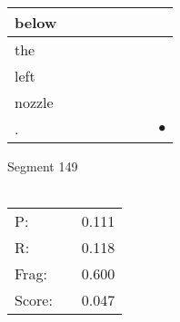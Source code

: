 \documentclass[landscape]{article}
\newcommand{\ssp}{\hspace{2pt}}
\newcommand{\mex}{\cellcolor{g}$\bullet$}
\begin{document}
\begin{tabular}{|l|p{10pt}|p{10pt}|p{10pt}|p{10pt}|p{10pt}|p{10pt}|p{10pt}|}
\hline
\ssp below \ssp&\hspace{2pt}&\hspace{2pt}&\hspace{2pt}&\hspace{2pt}&\hspace{2pt}&\hspace{2pt}&\hspace{2pt}\\
\hline
\ssp the \ssp&\hspace{2pt}&\hspace{2pt}&\hspace{2pt}&\hspace{2pt}&\hspace{2pt}&\hspace{2pt}&\hspace{2pt}\\
\hline
\ssp left \ssp&\hspace{2pt}&\hspace{2pt}&\hspace{2pt}&\hspace{2pt}&\hspace{2pt}&\hspace{2pt}&\hspace{2pt}\\
\hline
\ssp nozzle \ssp&\hspace{2pt}&\hspace{2pt}&\hspace{2pt}&\hspace{2pt}&\hspace{2pt}&\hspace{2pt}&\hspace{2pt}\\
\hline
\ssp \cellcolor{ref6}. \ssp&\hspace{2pt}&\hspace{2pt}&\hspace{2pt}&\hspace{2pt}&\hspace{2pt}&\hspace{2pt}&\hspace{2pt}\mex\\
\hline
\end{tabular}

\vspace{6pt}
\noindent Segment 149\\\\
\noindent\begin{tabular}{lm{12pt}r}
\hline
P:&&0.111\\
R:&&0.118\\
Frag:&&0.600\\
Score:&&0.047\\
\end{tabular}
\end{document}
